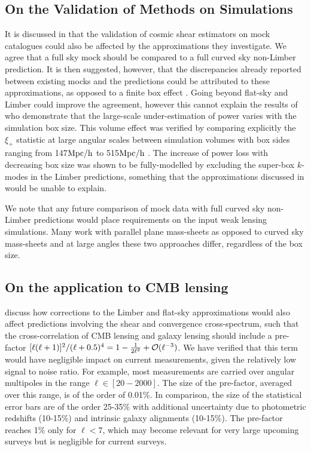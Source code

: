 \subsection{On the Validation of Methods on Simulations}
It is discussed in \citet{kitching/etal:2016} that the validation of cosmic shear estimators on mock catalogues could also be affected by the approximations they investigate.  We agree that a full sky mock should be compared to a full curved sky non-Limber prediction.  It is then suggested, however, that the discrepancies already reported between existing mocks and the predictions could be attributed to these approximations, as opposed to a finite box effect \citep{kiessling/etal:2011, harnois-deraps/etal:2012, harnois-deraps/vanwaerbeke:2015}.  Going beyond flat-sky and Limber could improve the agreement, however this cannot explain the results of \citet{harnois-deraps/vanwaerbeke:2015} who demonstrate that the large-scale under-estimation of power varies with the simulation box size. This volume effect was verified by comparing explicitly the $\xi_+$ statistic at large angular scales between simulation volumes with box sides  ranging from 147$\rm{Mpc/h}$ to 515$\rm{Mpc/h}$ \citep[see Fig. 5 in][]{harnois-deraps/vanwaerbeke:2015}. The increase of power loss with decreasing box size was shown to be fully-modelled by excluding the super-box $k$-modes in the Limber predictions, something that the approximations discussed in \citet{kitching/etal:2016} would be unable to explain.

We note that any future comparison of mock data with full curved sky non-Limber predictions would place requirements on the input weak lensing simulations.  Many work with parallel plane mass-sheets as opposed to curved sky mass-sheets and at large angles these two approaches differ, regardless of the box size. 

\subsection{On the application to CMB lensing}
\citet{kitching/etal:2016} discuss how corrections to the Limber and flat-sky approximations would also affect predictions involving the shear and convergence cross-spectrum, such that the cross-correlation of CMB lensing and galaxy lensing should include a pre-factor $ [\ell(\ell+1)]^2/(\ell+ 0.5)^4 = 1-{1\over 2\ell^2}+{\cal O}(\ell^{-3})$.   We have verified that this term would have negligible impact on current measurements, given the relatively low signal to noise ratio.  For example, most measurements \citep{hand/etal:2015, liu/hill:2015, kirk/etal:2016,harnois-deraps/etal:2016} are carried over angular multipoles in the range $\ell \in [20-2000]$.  The size of the pre-factor, averaged over this range, is of the order of 0.01\%. In comparison, the size of the statistical error bars are of the order 25-35\% with additional uncertainty due to photometric redshifts (10-15\%) and intrinsic galaxy alignments (10-15\%). The pre-factor reaches 1\% only for $\ell < 7$, which may become relevant for very large upcoming surveys but is negligible for current surveys. 

